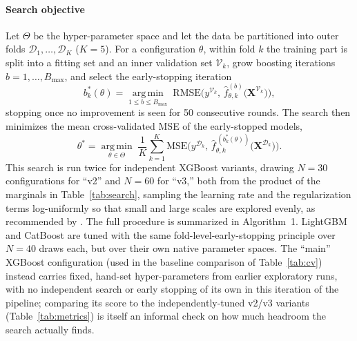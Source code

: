 \documentclass[journal]{IEEEtran}
\begin{document}
\paragraph{Search objective} Let $\Theta$ be the hyper-parameter space and let
the data be partitioned into outer folds $\mathcal{D}_1,\dots,\mathcal{D}_K$
($K=5$). For a configuration $\theta$, within fold $k$ the training part is split
into a fitting set and an inner validation set $\mathcal{V}_k$, grow boosting
iterations $b=1,\dots,B_{\max}$, and select the early-stopping iteration
\begin{equation}
b_k^{*}(\theta)=\operatorname*{arg\,min}_{1\le b\le B_{\max}}
\;\mathrm{RMSE}\!\Big(y^{\mathcal{V}_k},\,
\hat f^{(b)}_{\theta,k}\big(\mathbf{X}^{\mathcal{V}_k}\big)\Big),
\label{eq:earlystop}
\end{equation}
stopping once no improvement is seen for 50 consecutive rounds. The search then
minimizes the mean cross-validated MSE of the early-stopped models,
\begin{equation}
\theta^{*}=\operatorname*{arg\,min}_{\theta\in\Theta}\;
\frac{1}{K}\sum_{k=1}^{K}
\mathrm{MSE}\!\Big(y^{\mathcal{D}_k},\,
\hat f^{\,(b_k^{*}(\theta))}_{\theta,k}\big(\mathbf{X}^{\mathcal{D}_k}\big)\Big).
\label{eq:searchobj}
\end{equation}
This search is run twice for independent XGBoost variants, drawing $N=30$
configurations for ``v2'' and $N=60$ for ``v3,'' both from the product of the
marginals in Table~\ref{tab:search}, sampling the learning rate and the
regularization terms log-uniformly so that small and large scales are explored
evenly, as recommended by \cite{bergstra2012random}. The full procedure is
summarized in Algorithm~1. LightGBM and CatBoost are tuned with the same
fold-level-early-stopping principle over $N=40$ draws each, but over their own
native parameter spaces. The ``main'' XGBoost configuration (used in the
baseline comparison of Table~\ref{tab:cv}) instead carries fixed, hand-set
hyper-parameters from earlier exploratory runs, with no independent search or
early stopping of its own in this iteration of the pipeline; comparing its
score to the independently-tuned v2/v3 variants (Table~\ref{tab:metrics}) is
itself an informal check on how much headroom the search actually finds.
\end{document}

